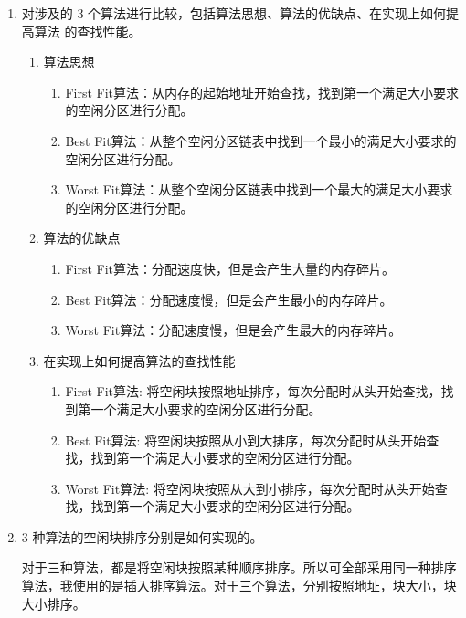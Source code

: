 \documentclass{article}
\begin{document}
    \begin{enumerate}
        \item 对涉及的 3 个算法进行比较，包括算法思想、算法的优缺点、在实现上如何提高算法
        的查找性能。

        \begin{enumerate}
            \item 算法思想
            \begin{enumerate}
                \item First Fit算法：从内存的起始地址开始查找，找到第一个满足大小要求的空闲分区进行分配。
                \item Best Fit算法：从整个空闲分区链表中找到一个最小的满足大小要求的空闲分区进行分配。
                \item Worst Fit算法：从整个空闲分区链表中找到一个最大的满足大小要求的空闲分区进行分配。
            \end{enumerate}
            \item 算法的优缺点
            \begin{enumerate}
                \item First Fit算法：分配速度快，但是会产生大量的内存碎片。
                \item Best Fit算法：分配速度慢，但是会产生最小的内存碎片。
                \item Worst Fit算法：分配速度慢，但是会产生最大的内存碎片。
            \end{enumerate}

            \item 在实现上如何提高算法的查找性能
            \begin{enumerate}
                \item First Fit算法: 将空闲块按照地址排序，每次分配时从头开始查找，找到第一个满足大小要求的空闲分区进行分配。
                \item Best Fit算法: 将空闲块按照从小到大排序，每次分配时从头开始查找，找到第一个满足大小要求的空闲分区进行分配。
                \item Worst Fit算法: 将空闲块按照从大到小排序，每次分配时从头开始查找，找到第一个满足大小要求的空闲分区进行分配。 
            \end{enumerate}
        \end{enumerate}


        \item 3 种算法的空闲块排序分别是如何实现的。
        
        对于三种算法，都是将空闲块按照某种顺序排序。所以可全部采用同一种排序算法，我使用的是插入排序算法。对于三个算法，分别按照地址，块大小，块大小排序。



\end{enumerate}
\end{document}
